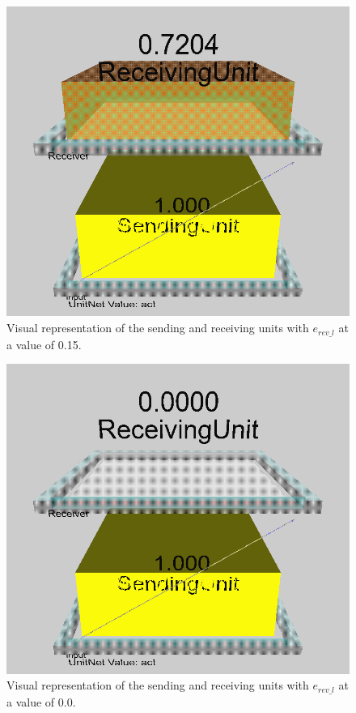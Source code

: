 \newpage
\begin{multicols}{2}
\begin{figure}[H]
\centering
\includegraphics[scale=0.225]{Media/Main/EQ1/2.4.S0.png}
\caption{Visual representation of the sending and receiving units with $e_{rev\_l}$ at a value of 0.15.}
\label{Q4.1}
\end{figure}

\begin{figure}[H]
\centering
\includegraphics[scale=0.225]{Media/Main/EQ1/2.4.S1.png}
\caption{Visual representation of the sending and receiving units with $e_{rev\_l}$ at a value of 0.0.}
\label{Q4.2}
\end{figure}


\end{multicols}
